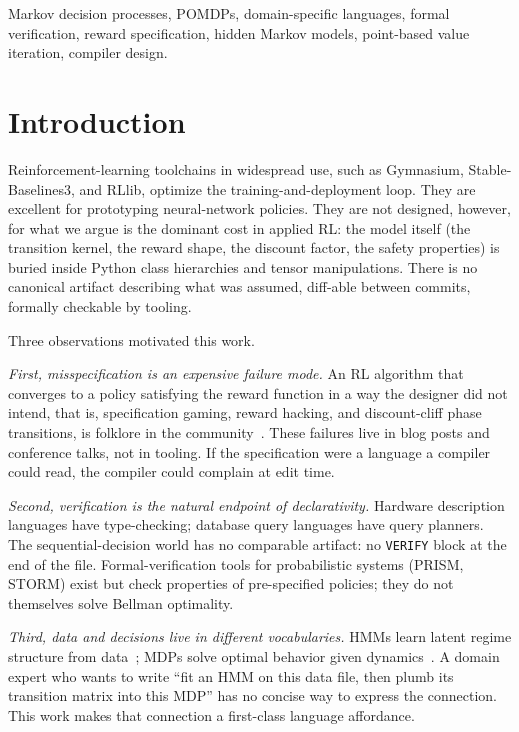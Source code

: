 \documentclass[conference]{IEEEtran}
\begin{document}
\begin{IEEEkeywords}
Markov decision processes, POMDPs, domain-specific languages,
formal verification, reward specification, hidden Markov models,
point-based value iteration, compiler design.
\end{IEEEkeywords}

\section{Introduction}

Reinforcement-learning toolchains in widespread use, such as
Gymnasium, Stable-Baselines3, and RLlib, optimize the
training-and-deployment loop. They are excellent for prototyping
neural-network policies. They are not designed, however, for what we
argue is the dominant cost in applied RL: the model itself (the
transition kernel, the reward shape, the discount factor, the safety
properties) is buried inside Python class hierarchies and tensor
manipulations. There is no canonical artifact describing what was
assumed, diff-able between commits, formally checkable by tooling.

Three observations motivated this work.

\emph{First, misspecification is an expensive failure mode.} An RL
algorithm that converges to a policy satisfying the reward function
in a way the designer did not intend, that is, specification gaming,
reward hacking, and discount-cliff phase transitions, is folklore in
the community~\cite{krakovna2020specification}. These failures live
in blog posts and conference talks, not in tooling. If the
specification were a language a compiler could read, the compiler
could complain at edit time.

\emph{Second, verification is the natural endpoint of declarativity.}
Hardware description languages have type-checking; database query
languages have query planners. The sequential-decision world has no
comparable artifact: no \texttt{VERIFY} block at the end of the
file. Formal-verification tools for probabilistic systems (PRISM,
STORM) exist but check properties of pre-specified policies; they do
not themselves solve Bellman optimality.

\emph{Third, data and decisions live in different vocabularies.}
HMMs learn latent regime structure from data~\cite{rabiner1989tutorial};
MDPs solve optimal behavior given dynamics~\cite{puterman2014markov}.
A domain expert who wants to write ``fit an HMM on this data file,
then plumb its transition matrix into this MDP'' has no concise way
to express the connection. This work makes that connection a
first-class language affordance.
\end{document}
